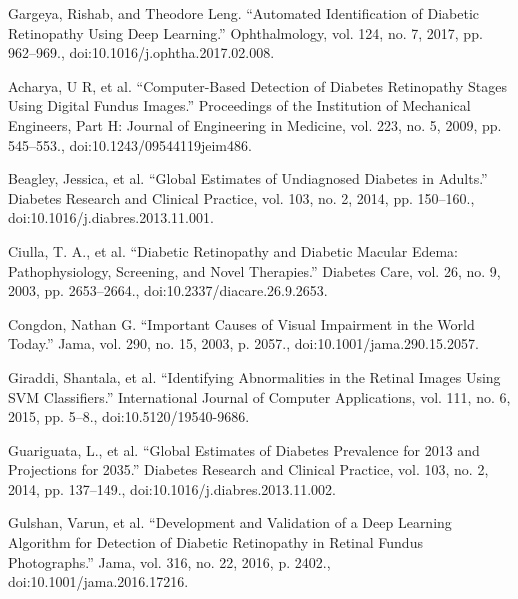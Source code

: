 

\begin{thebibliography}{99}

\nocite{*}
 Gargeya, Rishab, and Theodore Leng. “Automated Identification of Diabetic Retinopathy Using Deep Learning.” Ophthalmology, vol. 124, no. 7, 2017, pp. 962–969., doi:10.1016/j.ophtha.2017.02.008.

 Acharya, U R, et al. “Computer-Based Detection of Diabetes Retinopathy Stages Using Digital Fundus Images.” Proceedings of the Institution of Mechanical Engineers, Part H: Journal of Engineering in Medicine, vol. 223, no. 5, 2009, pp. 545–553., doi:10.1243/09544119jeim486.

 Beagley, Jessica, et al. “Global Estimates of Undiagnosed Diabetes in Adults.” Diabetes Research and Clinical Practice, vol. 103, no. 2, 2014, pp. 150–160., doi:10.1016/j.diabres.2013.11.001.

 Ciulla, T. A., et al. “Diabetic Retinopathy and Diabetic Macular Edema: Pathophysiology, Screening, and Novel Therapies.” Diabetes Care, vol. 26, no. 9, 2003, pp. 2653–2664., doi:10.2337/diacare.26.9.2653.

 Congdon, Nathan G. “Important Causes of Visual Impairment in the World Today.” Jama, vol. 290, no. 15, 2003, p. 2057., doi:10.1001/jama.290.15.2057.

 Giraddi, Shantala, et al. “Identifying Abnormalities in the Retinal Images Using SVM Classifiers.” International Journal of Computer Applications, vol. 111, no. 6, 2015, pp. 5–8., doi:10.5120/19540-9686.

 Guariguata, L., et al. “Global Estimates of Diabetes Prevalence for 2013 and Projections for 2035.” Diabetes Research and Clinical Practice, vol. 103, no. 2, 2014, pp. 137–149., doi:10.1016/j.diabres.2013.11.002.

 Gulshan, Varun, et al. “Development and Validation of a Deep Learning Algorithm for Detection of Diabetic Retinopathy in Retinal Fundus Photographs.” Jama, vol. 316, no. 22, 2016, p. 2402., doi:10.1001/jama.2016.17216.


\end{thebibliography}
